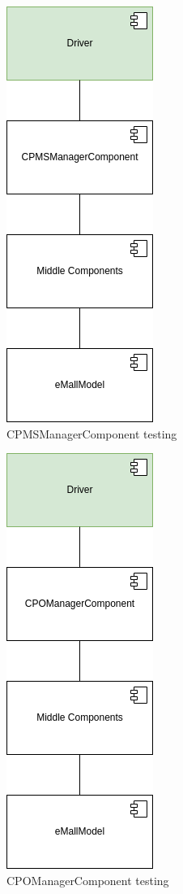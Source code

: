 \begin{figure}[H]
    \centering
    \includegraphics[keepaspectratio]{Testing/emall/cpmsmanager.png}
    \caption{\ac{CPMS}ManagerComponent testing}
\end{figure}
\begin{figure}[H]
    \centering
    \includegraphics[keepaspectratio]{Testing/emall/cpomanager.png}
    \caption{\ac{CPO}ManagerComponent testing}
\end{figure}
